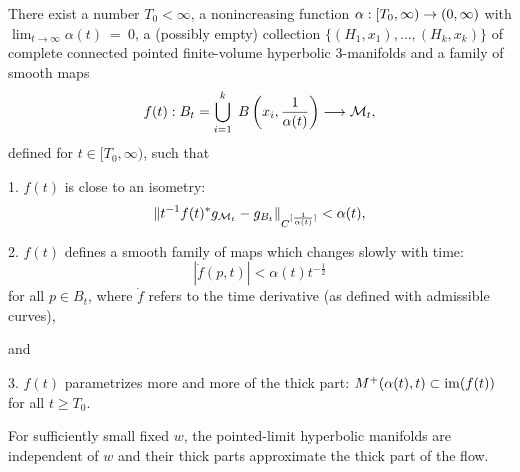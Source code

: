 \begin{proposition}
  \label{prop:kl-hyperbolic-rigidity-stabilization-thick-part-monotonicity-thick-thin-geometry}

\label{slowisotopy}
There exist a number $T_0<\infty$, a nonincreasing function
$\alpha:[T_0,\infty)\rightarrow (0,\infty)$ with
$\lim_{t \rightarrow \infty} \alpha(t) \: = \: 0$,
a (possibly empty) collection
$\{(H_1,x_1),\ldots,(H_k,x_k)\}$
of complete connected pointed finite-volume hyperbolic $3$-manifolds
and a family of smooth maps
\begin{equation}
f(t):B_t= \bigcup_{i=1}^k \;B \left( x_i, \frac{1}{\alpha(t)} \right)\longrightarrow {\mathcal M}_t,
\end{equation}
 defined for $t\in [T_0,\infty)$, such that

1.  $f(t)$ is close to an isometry:
\begin{equation}
\|t^{-1}f(t)^*g_{{\mathcal M}_t}-g_{B_t}\|_{C^{[\frac{1}{\alpha(t)}]}}<\alpha(t),
\end{equation}

2. $f(t)$ defines a smooth family of maps which changes slowly
with time:
\begin{equation}
|\dot{f}(p,t)|<\alpha(t)t^{-\frac12}
\end{equation}
for all $p\in B_t$,
where $\dot{f}$ refers to the time derivative (as defined
with admissible curves),

and

3. $f(t)$ parametrizes more and more of the thick part:
 $M^+(\alpha(t),t)\subset \operatorname{im}(f(t))$ for all $t\geq T_0$.
\end{proposition}

\begin{remark}
\label{rem:kl-hyperbolic-rigidity-stabilization-thick-part-characterization-thick-thin-geometry}



For sufficiently small fixed $w$, the pointed-limit hyperbolic manifolds are independent of $w$ and their thick parts approximate the thick part of the flow.
\end{remark}

